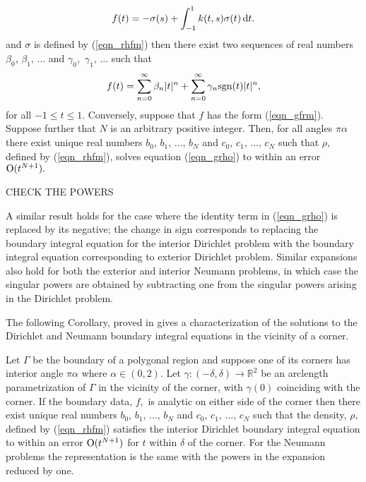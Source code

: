 \begin{theorem}
\begin{align}
f(t) = -\sigma(s) +\int_{-1}^1 k(t,s)  \sigma(t)\,{\rm d}t.
\label{eqn_grho}
\end{align}
and $\sigma$ is defined by (\ref{eqn_rhfm}) then there exist two sequences of real numbers $\beta_0$, $\beta_1,\,\dots$ and $\gamma_0,$ $\gamma_1,\,\dots$ such that
\begin{align}
f(t) = \sum_{n=0}^\infty\beta_n |t|^n + \sum_{n=0}^\infty \gamma_n {\rm sgn}(t) |t|^n,
\label{eqn_gfrm}
\end{align}
for all $-1 \le t \le 1.$ Conversely, suppose that $f$ has the form (\ref{eqn_gfrm}). Suppose further that $N$ is an arbitrary positive integer. Then, for all angles $\pi \alpha$ there exist unique real numbers $b_0,\,b_1,\,\dots,\,b_N$ and $c_0,\,c_1,\,\dots,\,c_N$ such that $\rho,$ defined by (\ref{eqn_rhfm}), solves equation  (\ref{eqn_grho}) to within an error ${\rm O}(t^{N+1}).$ 
\end{theorem}
{\color{red}CHECK THE POWERS}

\begin{remark1}
A similar result holds for the case where the identity term in (\ref{eqn_grho}) is replaced by its negative; the change in sign corresponds to replacing the boundary integral equation for the interior Dirichlet problem with the boundary integral equation corresponding to exterior Dirichlet problem. Similar expansions also hold for both the exterior and interior Neumann problems, in which case the singular powers are obtained by subtracting one from the singular powers arising in the Dirichlet problem.
\end{remark1}


The following Corollary, proved in \cite{serkhacha} gives a characterization of the solutions to the Dirichlet and Neumann boundary integral equations in the vicinity of a corner.

\begin{corollary}
Let $\Gamma$ be the boundary of a polygonal region and suppose one of its corners has interior angle $\pi \alpha$ where $\alpha \in (0,2).$ Let $\gamma:(-\delta,\delta) \rightarrow \mathbb{R}^2$ be an arclength parametrization of $\Gamma$ in the vicinity of the corner, with $\gamma(0)$ coinciding with the corner. If the boundary data, $f,$ is analytic on either side of the corner then there exist unique real numbers $b_0,\,b_1,\,\dots,\,b_N$ and $c_0,\,c_1,\,\dots,\,c_N$ such that the density, $\rho,$ defined by (\ref{eqn_rhfm}) satisfies the interior Dirichlet boundary integral equation to within an error ${\rm O}(t^{N+1})$ for $t$ within $\delta$ of the corner. For the Neumann problems the representation is the same with the powers in the expansion reduced by one.
\end{corollary}
